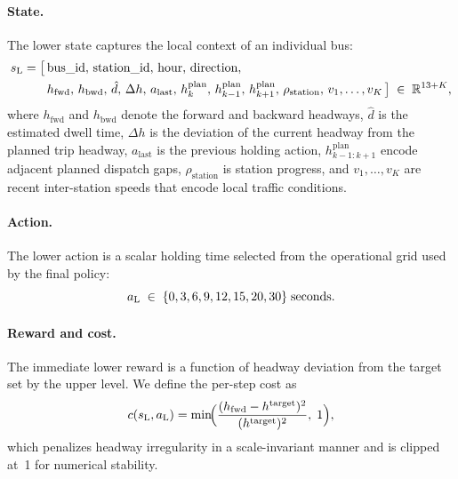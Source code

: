 \paragraph{State.}
The lower state captures the local context of an individual bus:
\begin{equation}
  \label{eq:lower_state}
  \begin{aligned}
    s_{\mathrm{L}} = \bigl[\,
      &\text{bus\_id},\,
       \text{station\_id},\,
       \text{hour},\,
       \text{direction},\\
      &h_{\mathrm{fwd}},\,
       h_{\mathrm{bwd}},\,
       \hat{d},\,
       \Delta h,\,
       a_{\mathrm{last}},\,
       h^{\mathrm{plan}}_k,\,
       h^{\mathrm{plan}}_{k-1},\,
       h^{\mathrm{plan}}_{k+1},\,
       \rho_{\mathrm{station}},\,
       v_1,\dots,v_K
    \,\bigr] \;\in\; \mathbb{R}^{13+K},
  \end{aligned}
\end{equation}
where $h_{\mathrm{fwd}}$ and $h_{\mathrm{bwd}}$ denote the forward and backward headways, $\hat{d}$ is the estimated dwell time, $\Delta h$ is the deviation of the current headway from the planned trip headway, $a_{\mathrm{last}}$ is the previous holding action, $h^{\mathrm{plan}}_{k-1:k+1}$ encode adjacent planned dispatch gaps, $\rho_{\mathrm{station}}$ is station progress, and $v_1,\dots,v_K$ are recent inter-station speeds that encode local traffic conditions.

\paragraph{Action.}
The lower action is a scalar holding time selected from the operational grid used by the final policy:
\begin{equation}
  \label{eq:lower_action}
  a_{\mathrm{L}} \;\in\; \{0,3,6,9,12,15,20,30\}\;\text{seconds}.
\end{equation}

\paragraph{Reward and cost.}
The immediate lower reward is a function of headway deviation from the target set by the upper level.
We define the per-step cost as
\begin{equation}
  \label{eq:lower_cost}
  c(s_{\mathrm{L}},a_{\mathrm{L}}) = \min\!\Bigl(\frac{(h_{\mathrm{fwd}} - h^{\mathrm{target}})^{2}}{(h^{\mathrm{target}})^{2}},\;1\Bigr),
\end{equation}
which penalizes headway irregularity in a scale-invariant manner and is clipped at~1 for numerical stability.

